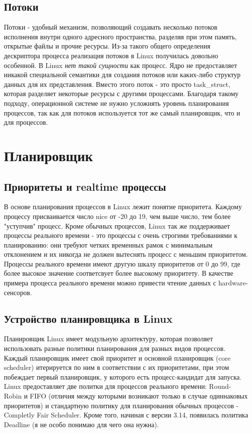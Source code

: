 \documentclass{article}
\begin{document}
\subsection{Потоки}
Потоки - удобный механизм, позволяющий создавать несколько потоков исполнения внутри одного адресного пространства, разделяя при этом память, открытые файлы и прочие ресурсы.
\bigbreak
Из-за такого общего определения дескриптора процесса реализация потоков в Linux получилась довольно особенной. В Linux \textit{нет такой сущности} как процесс. Ядро не предоставляет никакой специальной семантики для создания потоков или каких-либо структур данных для их представления. Вместо этого поток - это просто task\_struct, которая разделяет некоторые ресурсы с другими процессами.
\bigbreak
Благодаря такому подходу, операционной системе не нужно усложнять уровень планирования процессов, так как для потоков используется тот же самый планировщик, что и для процессов.

\section{Планировщик}
\subsection{Приоритеты и realtime процессы}
В основе планирования процессов в Linux лежит понятие приоритета. Каждому процессу присваивается число nice от -20 до 19, чем выше число, тем более "уступчив" процесс. Кроме обычных процессов, Linux так же поддерживает процессы реального времени - это процессы с очень строгими требованиями к планированию: они требуют четких временных рамок с минимальным отклонением и их никогда не должен вытеснять процесс с меньшим приоритетом. Процессы реального времени имеют другую шкалу приоритетов от 0 до 99, где более высокое значение соответсвует более высокому приоритету. В качестве примера процесса реального времени можно привести чтение данных с hardware-сенсоров.

\subsection{Устройство планировщика в Linux}
Планировщик Linux имеет модульную архитектуру, которая позволяет использовать разные политики планирования для разных видов процессов. Каждый планировщик имеет свой приоритет и основной планировщик (core scheduler) итерируется по ним в соответствии с их приоритетами, при этом побеждает первый планировщик, у которого есть процесс-кандидат для запуска.
\bigbreak
Linux предоставляет две политки для процессов реального времени: Round-Robin и FIFO (отличия между которыми возникают только в случае одиннаковых приоритетов) и стандартную политику для планирования обычных процессов - Completly Fair Scheduler. Кроме того, начиная с версии 3.14, появилась политика Deadline (я не особо понимаю для чего она нужна).
\end{document}

